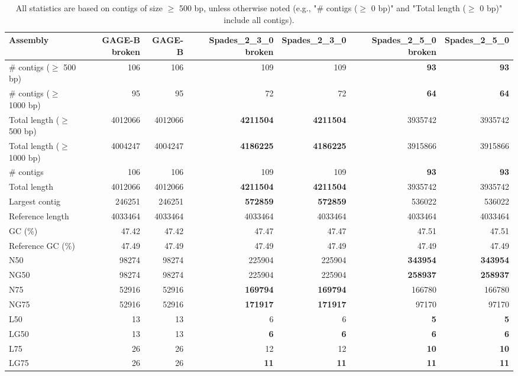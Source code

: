 \documentclass[12pt,a4paper]{article}
\begin{document}
\begin{table}[ht]
\begin{center}
\caption{All statistics are based on contigs of size $\geq$ 500 bp, unless otherwise noted (e.g., "\# contigs ($\geq$ 0 bp)" and "Total length ($\geq$ 0 bp)" include all contigs).}
\begin{tabular}{|l*{6}{|r}|}
\hline
Assembly & GAGE-B broken & GAGE-B & Spades\_2\_3\_0 broken & Spades\_2\_3\_0 & Spades\_2\_5\_0 broken & Spades\_2\_5\_0 \\ \hline
\# contigs ($\geq$ 500 bp) & 106 & 106 & 109 & 109 & {\bf 93} & {\bf 93} \\ \hline
\# contigs ($\geq$ 1000 bp) & 95 & 95 & 72 & 72 & {\bf 64} & {\bf 64} \\ \hline
Total length ($\geq$ 500 bp) & 4012066 & 4012066 & {\bf 4211504} & {\bf 4211504} & 3935742 & 3935742 \\ \hline
Total length ($\geq$ 1000 bp) & 4004247 & 4004247 & {\bf 4186225} & {\bf 4186225} & 3915866 & 3915866 \\ \hline
\# contigs & 106 & 106 & 109 & 109 & {\bf 93} & {\bf 93} \\ \hline
Total length & 4012066 & 4012066 & {\bf 4211504} & {\bf 4211504} & 3935742 & 3935742 \\ \hline
Largest contig & 246251 & 246251 & {\bf 572859} & {\bf 572859} & 536022 & 536022 \\ \hline
Reference length & 4033464 & 4033464 & 4033464 & 4033464 & 4033464 & 4033464 \\ \hline
GC (\%) & 47.42 & 47.42 & 47.47 & 47.47 & 47.51 & 47.51 \\ \hline
Reference GC (\%) & 47.49 & 47.49 & 47.49 & 47.49 & 47.49 & 47.49 \\ \hline
N50 & 98274 & 98274 & 225904 & 225904 & {\bf 343954} & {\bf 343954} \\ \hline
NG50 & 98274 & 98274 & 225904 & 225904 & {\bf 258937} & {\bf 258937} \\ \hline
N75 & 52916 & 52916 & {\bf 169794} & {\bf 169794} & 166780 & 166780 \\ \hline
NG75 & 52916 & 52916 & {\bf 171917} & {\bf 171917} & 97170 & 97170 \\ \hline
L50 & 13 & 13 & 6 & 6 & {\bf 5} & {\bf 5} \\ \hline
LG50 & 13 & 13 & {\bf 6} & {\bf 6} & {\bf 6} & {\bf 6} \\ \hline
L75 & 26 & 26 & 12 & 12 & {\bf 10} & {\bf 10} \\ \hline
LG75 & 26 & 26 & {\bf 11} & {\bf 11} & {\bf 11} & {\bf 11} \\ \hline

\end{tabular}
\end{center}
\end{table}
\end{document}
